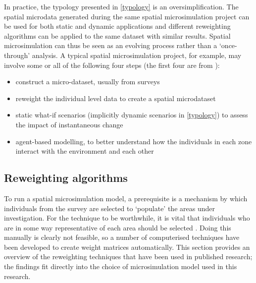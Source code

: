 In practice, the typology presented in \cref{typology} is an
oversimplification. The spatial microdata generated during the same spatial
microsimulation project can be used for both static and dynamic applications and
different reweighting algorithms can be applied to the same dataset with
similar results. Spatial microsimulation can thus be seen as an evolving
process rather than a `once-through' analysis. A typical spatial microsimulation
project, for example, may involve some or all of the following four steps
(the first four are from \citealp{ballas2003microsimulation-30-years}):
\begin{itemize}
 \item construct a micro-dataset, usually from surveys
 \item reweight the individual level data to create a spatial microdataset
 \item static what-if scenarios (implicitly dynamic scenarios in
\cref{typology}) to assess the impact of instantaneous change
 \item agent-based modelling, to better understand how the individuals in each
zone interact with the environment and each other
\end{itemize}

% 

\subsection{Reweighting algorithms} %
\label{sreweight}
To run a spatial microsimulation model, a prerequisite is a mechanism by
which individuals from the survey are selected to `populate' the areas under
investigation. For the technique to be worthwhile, it is vital that individuals
who are in some way representative of each area should be selected
\citep{Ballas2005}⁠. Doing this manually is clearly not feasible, so a number
of computerised techniques have been developed to create weight matrices
automatically. This section provides an overview of the reweighting techniques
that have been used in published research; the findings fit directly into the
choice of microsimulation model used in this research. %

